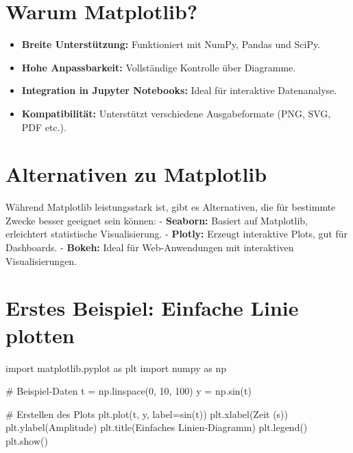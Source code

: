 \documentclass[
  letterpaper,
  DIV=11,
  numbers=noendperiod]{scrreprt}
\newenvironment{Shaded}{\begin{snugshade}}{\end{snugshade}}
\newcommand{\CommentTok}[1]{\textcolor[rgb]{0.37,0.37,0.37}{#1}}
\newcommand{\DecValTok}[1]{\textcolor[rgb]{0.68,0.00,0.00}{#1}}
\newcommand{\ImportTok}[1]{\textcolor[rgb]{0.00,0.46,0.62}{#1}}
\newcommand{\NormalTok}[1]{\textcolor[rgb]{0.00,0.23,0.31}{#1}}
\newcommand{\OperatorTok}[1]{\textcolor[rgb]{0.37,0.37,0.37}{#1}}
\newcommand{\StringTok}[1]{\textcolor[rgb]{0.13,0.47,0.30}{#1}}
\providecommand{\tightlist}{%
  \setlength{\itemsep}{0pt}\setlength{\parskip}{0pt}}\usepackage{longtable,booktabs,array}
\begin{document}
\section{Warum Matplotlib?}\label{warum-matplotlib}

\begin{itemize}
\tightlist
\item
  \textbf{Breite Unterstützung:} Funktioniert mit NumPy, Pandas und
  SciPy.
\item
  \textbf{Hohe Anpassbarkeit:} Vollständige Kontrolle über Diagramme.
\item
  \textbf{Integration in Jupyter Notebooks:} Ideal für interaktive
  Datenanalyse.
\item
  \textbf{Kompatibilität:} Unterstützt verschiedene Ausgabeformate (PNG,
  SVG, PDF etc.).
\end{itemize}

\section{Alternativen zu Matplotlib}\label{alternativen-zu-matplotlib}

Während Matplotlib leistungsstark ist, gibt es Alternativen, die für
bestimmte Zwecke besser geeignet sein können: - \textbf{Seaborn:}
Basiert auf Matplotlib, erleichtert statistische Visualisierung. -
\textbf{Plotly:} Erzeugt interaktive Plots, gut für Dashboards. -
\textbf{Bokeh:} Ideal für Web-Anwendungen mit interaktiven
Visualisierungen.

\section{Erstes Beispiel: Einfache Linie
plotten}\label{erstes-beispiel-einfache-linie-plotten}

\begin{Shaded}
\begin{Highlighting}[]
\ImportTok{import}\NormalTok{ matplotlib.pyplot }\ImportTok{as}\NormalTok{ plt}
\ImportTok{import}\NormalTok{ numpy }\ImportTok{as}\NormalTok{ np}

\CommentTok{\# Beispiel{-}Daten}
\NormalTok{t }\OperatorTok{=}\NormalTok{ np.linspace(}\DecValTok{0}\NormalTok{, }\DecValTok{10}\NormalTok{, }\DecValTok{100}\NormalTok{)}
\NormalTok{y }\OperatorTok{=}\NormalTok{ np.sin(t)}

\CommentTok{\# Erstellen des Plots}
\NormalTok{plt.plot(t, y, label}\OperatorTok{=}\StringTok{\textquotesingle{}sin(t)\textquotesingle{}}\NormalTok{)}
\NormalTok{plt.xlabel(}\StringTok{\textquotesingle{}Zeit (s)\textquotesingle{}}\NormalTok{)}
\NormalTok{plt.ylabel(}\StringTok{\textquotesingle{}Amplitude\textquotesingle{}}\NormalTok{)}
\NormalTok{plt.title(}\StringTok{\textquotesingle{}Einfaches Linien{-}Diagramm\textquotesingle{}}\NormalTok{)}
\NormalTok{plt.legend()}
\NormalTok{plt.show()}
\end{Highlighting}
\end{Shaded}
\end{document}
